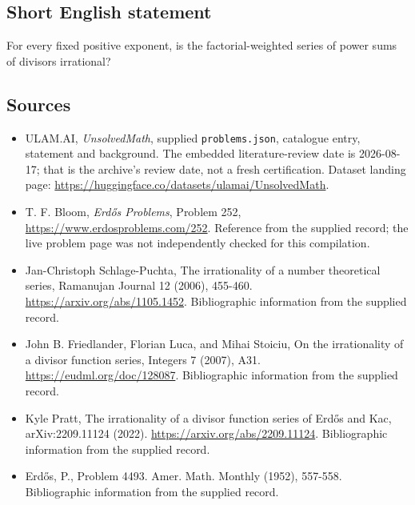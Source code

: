 \documentclass[11pt,a4paper]{article}
\begin{document}
\subsection{Short English statement}

For every fixed positive exponent, is the factorial-weighted series of power sums of divisors irrational?

\subsection{Sources}

{\small

\begin{itemize}

\item[\hypertarget{source:statement:1}{S1}] ULAM.AI, \emph{UnsolvedMath}, supplied \texttt{problems.json}, catalogue entry, statement and background. The embedded literature-review date is 2026-08-17; that is the archive’s review date, not a fresh certification. Dataset landing page: \url{https://huggingface.co/datasets/ulamai/UnsolvedMath}.

\item[\hypertarget{source:statement:2}{S2}] T. F. Bloom, \emph{Erdős Problems}, Problem 252, \url{https://www.erdosproblems.com/252}. Reference from the supplied record; the live problem page was not independently checked for this compilation.

\item[\hypertarget{source:statement:3}{S3}] Jan-Christoph Schlage-Puchta, The irrationality of a number theoretical series, Ramanujan Journal 12 (2006), 455-460. \url{https://arxiv.org/abs/1105.1452}. Bibliographic information from the supplied record.

\item[\hypertarget{source:statement:4}{S4}] John B. Friedlander, Florian Luca, and Mihai Stoiciu, On the irrationality of a divisor function series, Integers 7 (2007), A31. \url{https://eudml.org/doc/128087}. Bibliographic information from the supplied record.

\item[\hypertarget{source:statement:5}{S5}] Kyle Pratt, The irrationality of a divisor function series of Erdős and Kac, arXiv:2209.11124 (2022). \url{https://arxiv.org/abs/2209.11124}. Bibliographic information from the supplied record.

\item[\hypertarget{source:statement:6}{S6}] Erd\H{o}s, P., Problem 4493. Amer. Math. Monthly (1952), 557-558. Bibliographic information from the supplied record.

\end{itemize}

}

\label{end:statement}
\end{document}
